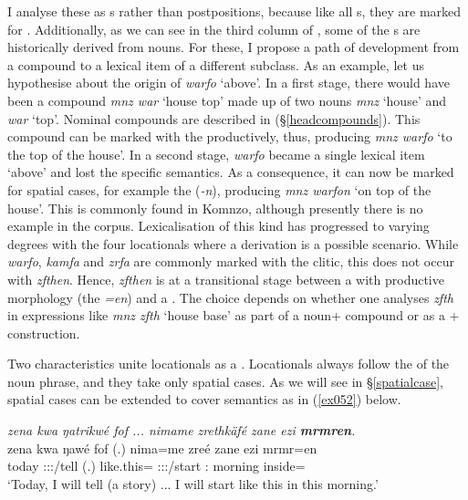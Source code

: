 I analyse these as  s rather than postpositions, because like all s, they are marked for . Additionally, as we can see in the third column of , some of the  s are historically derived from nouns. For these, I propose a path of development from a  compound to a lexical item of a different  subclass. As an example, let us hypothesise about the origin of \emph{warfo} `above'. In a first stage, there would have been a  compound \emph{mnz war} `house top' made up of two nouns \emph{mnz} `house' and \emph{war} `top'. Nominal compounds are described in (\S{}\ref{headcompounds}). This compound can be marked with the   productively, thus, producing \emph{mnz warfo} `to the top of the house'. In a second stage, \emph{warfo} became a single lexical item `above' and lost the specific  semantics. As a consequence, it can now be marked for spatial cases, for example the   (\emph{-n}), producing \emph{mnz warfon} `on top of the house'. This is commonly found in Komnzo, although presently there is no example in the corpus. Lexicalisation of this kind has progressed to varying degrees with the four locationals where a  derivation is a possible scenario. While \emph{warfo}, \emph{kamfa} and \emph{zrfa} are commonly marked with the   clitic, this does not occur with \emph{zfthen}. Hence, \emph{zfthen} is at a transitional stage between a  with productive morphology (the   \emph{=en}) and a . The choice depends on whether one analyses \emph{zfth} in expressions like \emph{mnz zfth} `house base' as part of a noun+ compound or as a + construction.%

Two characteristics unite locationals as a . Locationals always follow the  of the noun phrase, and they take only spatial cases. As we will see in \S{}\ref{spatialcase}, spatial cases can be extended to cover  semantics as in (\ref{ex052}) below.

\begin{exe}
	\ex \emph{zena kwa ŋatrikwé fof ... nimame zrethkäfé zane ezi \textbf{mrmren}.}\\
	\gll zena kwa ŋawé fof (.) nima=me zreé zane ezi mrmr=en\\
	today \Fut{} \Fsg:\Sbj:\Nonpast:\Ipfv/tell \Emph{} (.) {like.this}=\Ins{} \Fsg:\Sbj:\Irr:\Pfv/start \Dem:\Prox{} morning inside=\Loc{}\\
	\trans `Today, I will tell (a story) ... I will start like this in this morning.'\\ 
	\label{ex052}
\end{exe}

